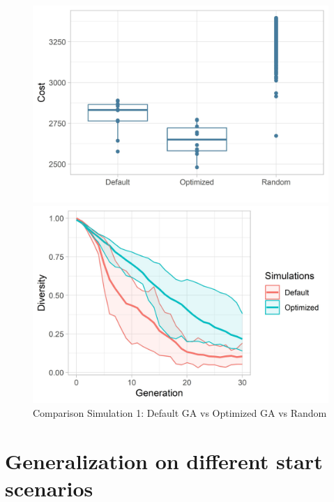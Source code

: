 \begin{figure}[ht] 
	\label{figure:sim_1_comparison}
	\begin{minipage}[b]{0.5\linewidth}
		\centering
		\includegraphics[width=1\linewidth]{simulations/evaluation/plots/sim_1_comparison} 
	\end{minipage}%
	\begin{minipage}[b]{0.5\linewidth}
		\centering
		\includegraphics[width=1\linewidth]{simulations/evaluation/plots/sim_1_diversity} 
	\end{minipage} 
	\caption{Comparison Simulation 1: Default GA vs Optimized GA vs Random}
\end{figure}


\section{Generalization on different start scenarios}

